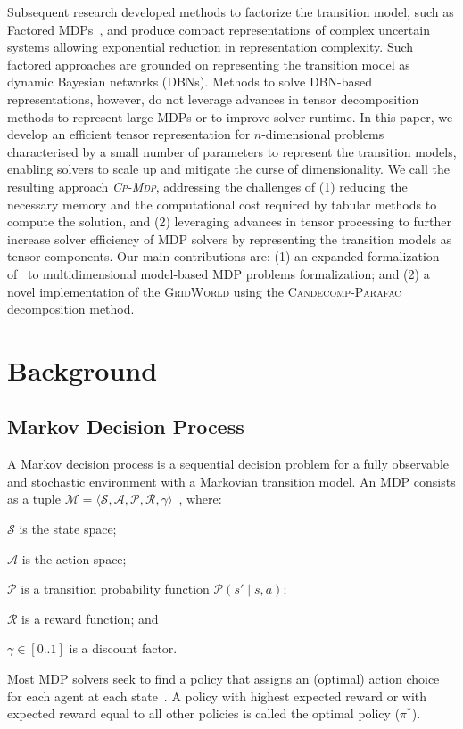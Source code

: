 \documentclass[letterpaper]{article} %
\newcommand\gridworld{\textsc{GridWorld}}
\newcommand\cpmdp{\textsc{Cp-Mdp}}
\newcommand\candecompparafac{\textsc{Candecomp-Parafac}}
\begin{document}
Subsequent research developed methods to factorize the transition model, such as Factored MDPs~\cite{boutilier_policy_1995,Guestrin_efficient_algorithms_factored_mdp_2003,karinaDelgado_solver_factered_MDP_2011}, and produce compact representations of complex uncertain systems allowing exponential reduction in representation complexity. 
Such factored approaches are grounded on representing the transition model as dynamic Bayesian networks (DBNs). 
Methods to solve DBN-based representations, however, do not leverage advances in tensor decomposition methods to represent large MDPs or to improve solver runtime. 
In this paper, we develop an efficient tensor representation for $n$-dimensional problems characterised by a small number of parameters to represent the transition models, enabling solvers to scale up and mitigate the curse of dimensionality. 
We call the resulting approach \emph{\cpmdp{}}, addressing the challenges of (1) reducing the necessary memory and the computational cost required by tabular methods to compute the solution, and (2) leveraging advances in tensor processing to further increase solver efficiency of MDP solvers by representing the transition models as tensor components.
Our main contributions are: (1) an expanded formalization of~\cite{tensor-based-mdp-daniela} %
to multidimensional model-based MDP problems formalization; and (2) a novel implementation of the \gridworld{} using the \candecompparafac{}~\cite{CANDECOMP&INDSCAL} decomposition method. 


\section{Background}

\subsection{Markov Decision Process}

A Markov decision process is a sequential decision problem for a fully observable and stochastic environment with a Markovian transition model. 
An MDP consists as a tuple $\mathcal{M} = \langle \mathcal{S}, \mathcal{A}, \mathcal{P}, \mathcal{R}, \gamma \rangle$~\cite[Ch. 3]{sutton_book_reinforcement_learning_2018}, where:
\begin{inparaitem}
    \item[] $\mathcal{S}$ is the state space;
    \item[] $\mathcal{A}$ is the action space;
    \item[] $\mathcal{P}$ is a transition probability function {$\mathcal{P}(s' \mid s, a)$};
    \item[] $\mathcal{R}$ is a reward function; and
    \item[] $\gamma \in [0..1]$ is a discount factor.
\end{inparaitem}
% 
Most MDP solvers seek to find a policy that assigns an (optimal) action choice for each agent at each state~\cite{Guestrin_PhDThesis_2003}. 
A policy with highest expected reward or with expected reward equal to all other policies is called the optimal policy ({$\pi^{*}$}).
\end{document}
